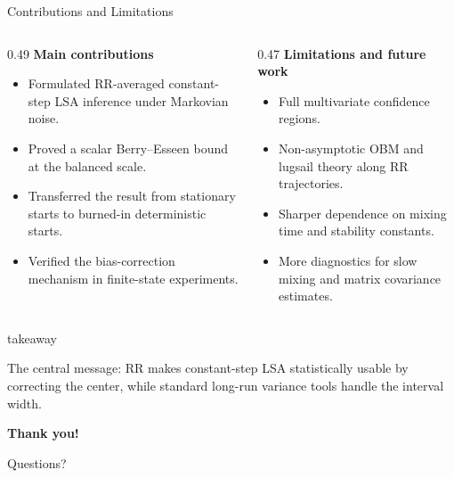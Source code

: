 \documentclass[11pt,aspectratio=169,xcolor=table]{beamer}
\newcommand{\colhead}[1]{\textcolor{ThesisBlue}{\bfseries #1}}
\newenvironment{takeawaybox}
  {\begin{beamercolorbox}[wd=\linewidth,sep=0.52em,leftskip=0.25em,rightskip=0.25em,rounded=true]{takeaway}%
   \begin{minipage}{0.96\linewidth}%
   \llap{{\color{ThesisGreen}\rule{2.5pt}{2.6ex}}\hspace{0.5em}}}
  {\end{minipage}\end{beamercolorbox}}
\begin{document}
\begin{frame}[shrink=2]{Contributions and Limitations}
\small
\begin{columns}[T,onlytextwidth]
  \begin{column}{0.49\textwidth}
    \colhead{Main contributions}
    \begin{itemize}
      \item Formulated RR-averaged constant-step LSA inference under
      Markovian noise.
      \item Proved a scalar Berry--Esseen bound at the balanced scale.
      \item Transferred the result from stationary starts to burned-in
      deterministic starts.
      \item Verified the bias-correction mechanism in finite-state
      experiments.
    \end{itemize}
  \end{column}
  \begin{column}{0.47\textwidth}
    \colhead{Limitations and future work}
    \begin{itemize}
      \item Full multivariate confidence regions.
      \item Non-asymptotic OBM and lugsail theory along RR trajectories.
      \item Sharper dependence on mixing time and stability constants.
      \item More diagnostics for slow mixing and matrix covariance estimates.
    \end{itemize}
  \end{column}
\end{columns}

\vspace{0.5em}
\begin{takeawaybox}
The central message: RR makes constant-step LSA statistically usable by
correcting the center, while standard long-run variance tools handle the
interval width.
\end{takeawaybox}
\end{frame}

\begin{frame}[plain]
  \vfill
  \begin{center}
    {\fontsize{26}{31}\selectfont\bfseries\color{ThesisBlue}Thank you!\par}
    \vspace{0.9em}
    {\Large\color{ThesisGray}Questions?\par}
  \end{center}
  \vfill
\end{frame}
\end{document}
